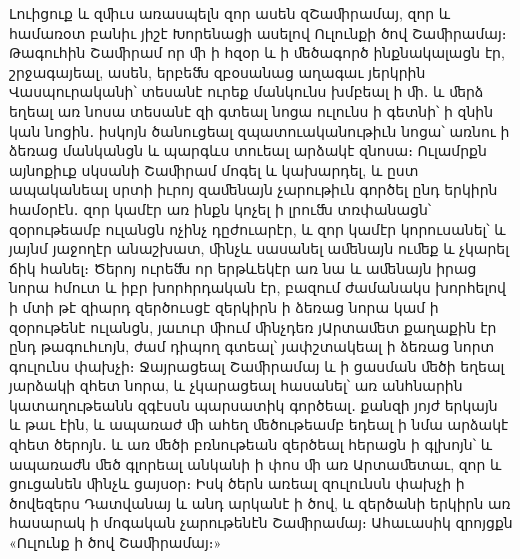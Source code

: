 \documentclass{article}
\begin{document}
{Լուիցուք և զﬕւս առասպելն զոր ասեն զՇաﬕրամայ, զոր և համառօտ բանիւ յիշէ Խորենացի ասելով Ուլունքի ծով Շաﬕրամայ։ Թագուհին Շաﬕրամ որ ﬕ ի հզօր և ի ﬔծագործ ինքնակալացն էր, շրջագայեալ, ասեն, երբեﬓ զբօսանաց աղագաւ յերկրին Վասպուրականի՝ տեսանէ ուրեք մանկունս խմբեալ ի ﬕ․ և ﬔրձ եղեալ առ նոսա տեսանէ զի գտեալ նոցա ուլունս ի գետնի՝ ի զնին կան նոցին․ իսկոյն ծանուցեալ զպատուականութիւն նոցա՝ առնու ի ձեռաց մանկանցն և պարգևս տուեալ արձակէ զնոսա։ Ուլամրքն այնոքիւք սկսանի Շաﬕրամ մոգել և կախարդել, և ըստ ապականեալ սրտի իւրոյ զաﬔնայն չարութիւն գործել ընդ երկիրն համօրէն․ զոր կամէր առ ինքն կոչել ի լրուﬓ տռփանացն՝ զօրութեամբ ուլանցն ոչինչ դըժուարէր, և զոր կամէր կորուսանել՝ և յայնմ յաջողէր անաշխատ, ﬕնչև սասանել աﬔնայն ուﬔք և չկարել ճիկ հանել։ Ծերոյ ուրեﬓ որ երթևեկէր առ նա և աﬔնայն իրաց նորա հմուտ և իբր խորհրդական էր, բազում ժամանակս խորհելով ի մտի թէ զիարդ զերծուսցէ զերկիրն ի ձեռաց նորա կամ ի զօրութենէ ուլանցն, յաւուր ﬕում ﬕնչդեռ յԱրտաﬔտ քաղաքին էր ընդ թագուհւոյն, ժամ դիպող գտեալ՝ յափշտակեալ ի ձեռաց նորտ գուլունս փախչի։ Ջայրացեալ Շաﬕրամայ և ի ցասման ﬔծի եղեալ յարձակի զհետ նորա, և չկարացեալ հասանել՝ առ անհնարին կատաղութեանն զգէսսն պարսատիկ գործեալ․ քանզի յոյժ երկայն և թաւ էին, և ապառաժ ﬕ ահեղ ﬔծութեամբ եդեալ ի նմա արձակէ զհետ ծերոյն․ և առ ﬔծի բռնութեան զերծեալ հերացն ի գլխոյն՝ և ապառաժն ﬔծ գլորեալ անկանի ի փոս ﬕ առ Արտաﬔտաւ, զոր և ցուցանեն ﬕնչև ցայսօր։ Իսկ ծերն առեալ զուլունսն փախչի ի ծովեզերս Դատվանայ և անդ արկանէ ի ծով, և զերծանի երկիրն առ հասարակ ի մոգական չարութենէն Շաﬕրամայ։ Ահաւասիկ զրոյցքն «Ուլունք ի ծով Շաﬕրամայ։»

}
\end{document}
